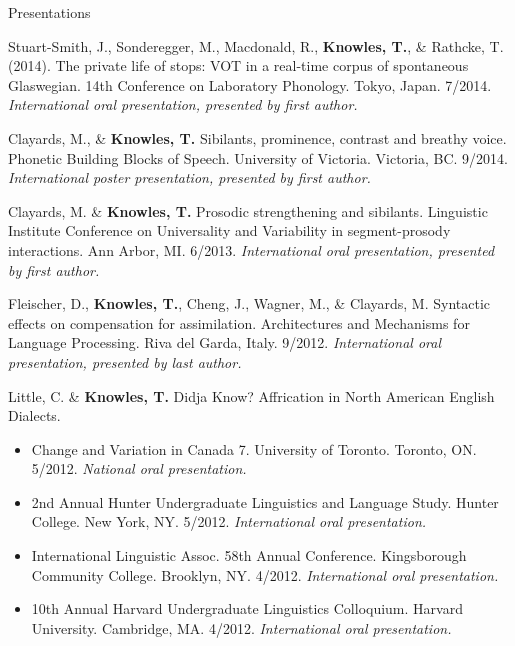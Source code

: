 \documentclass{resume} %
\begin{document}
\begin{rSection}{Presentations}
\begin{etaremune}
\item Stuart-Smith, J., Sonderegger, M., Macdonald, R., {\bf Knowles, T.}, \& Rathcke, T. (2014). The private life of stops: VOT in a real-time corpus of spontaneous Glaswegian. 14th Conference on Laboratory Phonology. Tokyo, Japan. 7/2014. \emph{International oral presentation, presented by first author.}
	
\item Clayards, M., \& {\bf Knowles, T.} Sibilants, prominence, contrast and breathy voice. Phonetic Building Blocks of Speech. University of Victoria. Victoria, BC. 9/2014. \emph{International poster presentation, presented by first author.}
	
	
\item Clayards, M. \& {\bf Knowles, T.} Prosodic strengthening and sibilants. Linguistic Institute Conference on Universality and Variability in segment-prosody interactions. Ann Arbor, MI. 6/2013. \emph{International oral presentation, presented by first author.}
	
\item Fleischer, D., {\bf Knowles, T.}, Cheng, J., Wagner, M., \& Clayards, M. Syntactic effects on compensation for assimilation. Architectures and Mechanisms for Language Processing. Riva del Garda, Italy. 9/2012. \emph{International oral presentation, presented by last author.}
	
\item Little, C. \& {\bf Knowles, T.} Didja Know? Affrication in North American English Dialects.
	\begin{itemize}
				\renewcommand\labelitemi{$\cdot$}
		\item Change and Variation in Canada 7. University of Toronto. Toronto, ON. 5/2012. \emph{National oral presentation.}
		\item 2nd Annual Hunter Undergraduate Linguistics and Language Study. Hunter College. New York, NY. 5/2012. \emph{International oral presentation.}
		\item International Linguistic Assoc. 58th Annual Conference. Kingsborough Community College. Brooklyn, NY. 4/2012. \emph{International oral presentation.}
		\item 10th Annual Harvard Undergraduate Linguistics Colloquium. Harvard University. Cambridge, MA. 4/2012. \emph{International oral presentation.}
	\end{itemize}
	

\end{etaremune}
\end{rSection}
\end{document}
